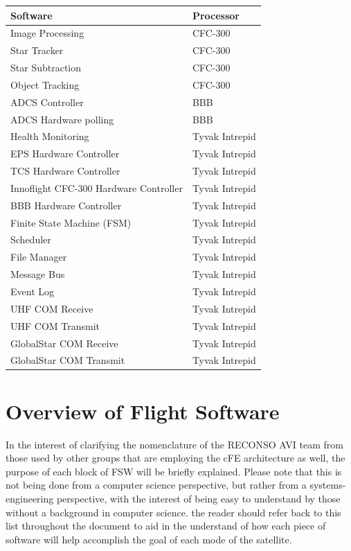 \documentclass{article}
\begin{document}
\begin{table}[h!]
\begin{adjustbox}{center}
\quad

\begin{tabular}{|l|l|}
\hline
Software & Processor \\ \hline \hline
Image Processing & CFC-300 \\ \hline
Star Tracker & CFC-300 \\ \hline
Star Subtraction & CFC-300 \\ \hline
Object Tracking & CFC-300 \\ \hline \hline
ADCS Controller & BBB \\ \hline
ADCS Hardware polling & BBB \\ \hline \hline
Health Monitoring & Tyvak Intrepid \\ \hline
EPS Hardware Controller & Tyvak Intrepid \\ \hline
TCS Hardware Controller & Tyvak Intrepid \\ \hline
Innoflight CFC-300 Hardware Controller & Tyvak Intrepid \\ \hline
BBB Hardware Controller & Tyvak Intrepid \\ \hline
Finite State Machine (FSM) & Tyvak Intrepid \\ \hline
Scheduler & Tyvak Intrepid \\ \hline
File Manager & Tyvak Intrepid \\ \hline
Message Bus & Tyvak Intrepid \\ \hline
Event Log & Tyvak Intrepid \\ \hline
UHF COM Receive & Tyvak Intrepid \\ \hline
UHF COM Transmit & Tyvak Intrepid \\ \hline
GlobalStar COM Receive & Tyvak Intrepid \\ \hline
GlobalStar COM Transmit & Tyvak Intrepid \\ \hline
\end{tabular}
\end{adjustbox}
\end{table}

\newpage

\section{Overview of Flight Software}

In the interest of clarifying the nomenclature of the RECONSO AVI team from those used by other groups that are employing the cFE architecture as well, the purpose of each block of FSW will be briefly explained. Please note that this is not being done from a computer science perspective, but rather from a systems-engineering perspective, with the interest of being easy to understand by those without a background in computer science. the reader should refer back to this list throughout the document to aid in the understand of how each piece of software will help accomplish the goal of each mode of the satellite.
\end{document}
